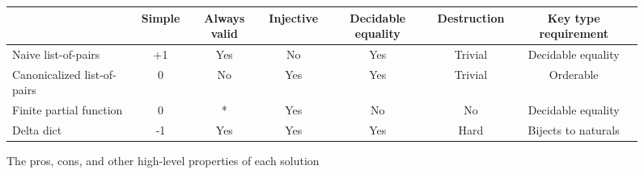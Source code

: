 \documentclass[nonacm]{acmart}
\theoremstyle{slplain}
\numberwithin{thm}{section}
\begin{document}
\begin{figure}[H]
  \begin{tabular}{ l | c | c | c | c | c | c}
                               & Simple & Always valid & Injective & Decidable equality & Destruction & Key type requirement
   \\\hline
   Naive list-of-pairs         & +1     & Yes          & No        & Yes                & Trivial     & Decidable equality
   \\\hline
   Canonicalized list-of-pairs & 0      & No           & Yes       & Yes                & Trivial     & Orderable
   \\\hline
   Finite partial function     & 0      & *            & Yes       & No                 & No          & Decidable equality
   \\\hline
   Delta dict                  & -1     & Yes          & Yes       & Yes                & Hard        & Bijects to naturals
  \end{tabular}
  \caption{The pros, cons, and other high-level properties of each solution}
  \label{fig:pros-cons}
\end{figure}



\end{document}
